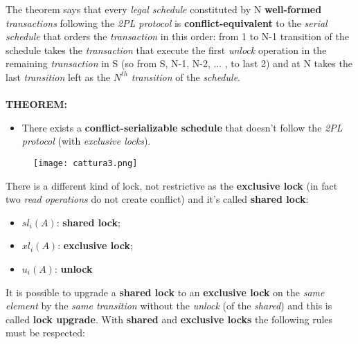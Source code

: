 \documentclass{article}
\begin{document}
The theorem says that every \emph{legal schedule} constituted by N \textbf{well-formed} \emph{transactions} following the \emph{2PL protocol} is \textbf{conflict-equivalent} to the \emph{serial schedule} that orders the \emph{transaction} in this order: from 1 to N-1 transition of the schedule takes the \emph{transaction} that execute the first \emph{unlock} operation in the remaining \emph{transaction} in S (so from S, N-1, N-2, ... , to last 2) and at N takes the last \emph{transition} left as the $N^{th}$ \emph{transition} of the \emph{schedule}. \\\\
\textbf{THEOREM:}
\begin{itemize}
\item There exists a \textbf{conflict-serializable schedule} that doesn't follow the \emph{2PL protocol} (with \emph{exclusive locks}). 
\end{itemize}
\begin{figure}[H]
  \centering
  \texttt{[image: cattura3.png]}
\end{figure}
\pagebreak
There is a different kind of lock, not restrictive as the \textbf{exclusive lock} (in fact two \emph{read operations} do not create conflict) and it's called \textbf{shared lock}:
\begin{itemize}
\item $sl_i(A)$: \textbf{shared lock};
\item $xl_i(A)$: \textbf{exclusive lock};
\item $u_i(A)$: \textbf{unlock}
\end{itemize}
It is possible to upgrade a \textbf{shared lock} to an \textbf{exclusive lock} on the \emph{same element} by the \emph{same transition} without the \emph{unlock} (of the \emph{shared}) and this is called \textbf{lock upgrade}. With \textbf{shared} and \textbf{exclusive locks} the following rules must be respected:
\end{document}

